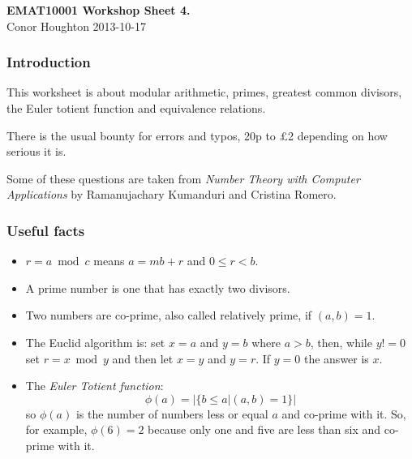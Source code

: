 \documentclass[12pt]{article}
\begin{document}
\begin{center}
{\bf EMAT10001 Workshop Sheet 4.}\\[1cm]{} Conor Houghton 2013-10-17
\end{center}
\subsubsection*{Introduction} 
This worksheet is about modular arithmetic, primes, greatest common
divisors, the Euler totient function and equivalence relations.

There is the usual bounty for errors and typos, 20p to \pounds 2
depending on how serious it is.

Some of these questions are taken from \emph{Number Theory with
  Computer Applications} by Ramanujachary Kumanduri and Cristina
Romero.

\subsubsection*{Useful facts}
\begin{itemize}
\item $r=a\bmod c$ means $a=mb+r$ and $0\le r<b$.
\item A prime number is one that has exactly two divisors.
\item Two numbers are co-prime, also called relatively prime, if $(a,b)=1$.
\item The Euclid algorithm is: set $x=a$ and $y=b$ where $a>b$, then, while $y!=0$
  set $r=x\bmod y$ and then let $x=y$ and $y=r$. If $y=0$ the answer
  is $x$.
\item  The \emph{Euler Totient function}:
\begin{equation}
\phi(a)=|\{b\le a|(a,b)=1\}|
\end{equation}
so $\phi(a)$ is the number of numbers less or equal $a$ and co-prime with it. So, for example, $\phi(6)=2$ because only one and five are less than six and co-prime with it.

\end{itemize}
\end{document}

